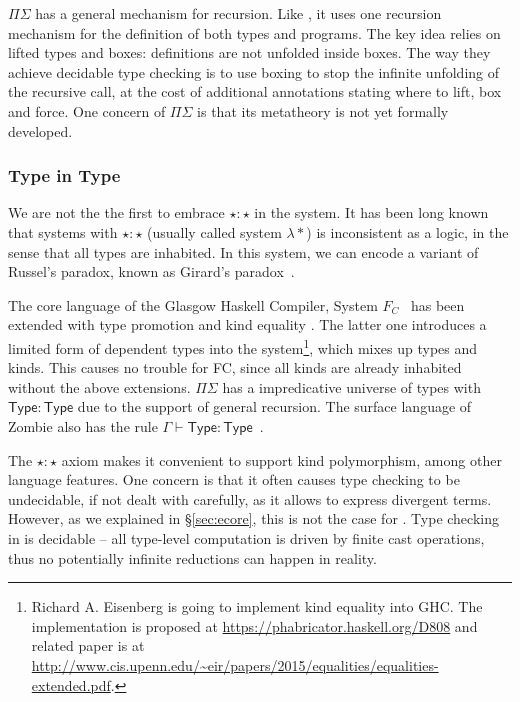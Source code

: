 $\Pi\Sigma$ has a general mechanism for recursion. Like \name, it uses
one recursion mechanism for the definition of both types and
programs. The key idea relies on lifted types and boxes: definitions
are not unfolded inside boxes. The way they achieve decidable type
checking is to use boxing to stop the infinite unfolding of the
recursive call, at the cost of additional annotations stating where to
lift, box and force. One concern of $\Pi\Sigma$ is that its metatheory
is not yet formally developed.

\subsubsection{Type in Type}

We are not the the first to embrace $\star : \star$ in the system. It
has been long known that systems with $\star : \star$ (usually called
system $\lambda *$) is inconsistent as a logic, in the sense that all
types are inhabited. In this system, we can encode a variant of
Russel's paradox, known as Girard's
paradox~\cite{coquand1986analysis}.

The core language of the Glasgow Haskell Compiler, System $F_{C}$~\cite{fc}
has been extended with type promotion \cite{fc:pro} and kind equality
\cite{fc:kind}. The latter one introduces a limited form of dependent
types into the system\footnote{Richard A. Eisenberg is going to
  implement kind equality \cite{fc:kind} into GHC. The implementation
  is proposed at \url{https://phabricator.haskell.org/D808} and
  related paper is at
  \url{http://www.cis.upenn.edu/~eir/papers/2015/equalities/equalities-extended.pdf}.},
which mixes up types and kinds. This causes no trouble for FC, since
all kinds are already inhabited without the above
extensions. $\Pi\Sigma$ has a impredicative universe of types with
$\mathsf{Type} : \mathsf{Type}$ due to the support of general
recursion. The surface language of Zombie also has the rule
$\Gamma \vdash \mathsf{Type} : \mathsf{Type}$~\cite{zombie:popl15}.

The $\star : \star$ axiom makes it convenient to support kind
polymorphism, among other language features. One concern is that it
often causes type checking to be undecidable, if not dealt with
carefully, as it allows to express divergent terms. However, as we
explained in \S\ref{sec:ecore}, this is not the case for \name. Type
checking in \name is decidable -- all type-level computation is driven
by finite cast operations, thus no potentially infinite reductions can
happen in reality.

